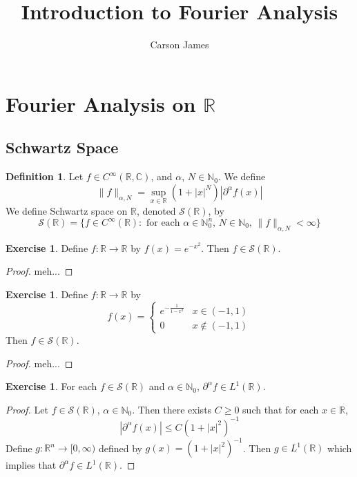 \documentclass[12pt]{amsart}
\theoremstyle{definition}
\newtheorem{defn}[definition]{Definition}
\newtheorem{ex}[definition]{Exercise}
\newcommand{\p}{\partial}
\newcommand{\al}{\alpha}
\newcommand{\C}{\mathbb{C}}
\newcommand{\N}{\mathbb{N}}
\newcommand{\R}{\mathbb{R}}
\newcommand{\MS}{\mathcal{S}}
\newcommand{\Rg}{[0,\infty)}
\newcommand{\lex}[1]{\label{ex:#1}}
\newcommand{\ld}[1]{\label{defn:#1}}
\begin{document}
	
	\title{Introduction to Fourier Analysis}
	\author{Carson James}
	\maketitle
	
	\tableofcontents
	
	\newpage
	\section{Fourier Analysis on $\R$}	
	
	\subsection{Schwartz Space}
	
	\begin{defn}
		\ld{101} Let $f \in C^{\infty}(\R, \C)$, and $\al$, $N \in \N_0$. We define $$\|f\|_{\al, N} = \sup_{x \in \R} (1+|x|^N) |\p^{\al}f (x) |$$
		We define Schwartz space on $\R$, denoted $\MS(\R)$, by $$\MS(\R) = \{f \in C^{\infty}(\R): \text{ for each $\al \in \N_0^n$, $N \in \N_0$, } \|f\|_{\al, N} < \infty\}$$
	\end{defn}

	\begin{ex}
		Define $f:\R \rightarrow \R$ by $f(x) = e^{-x^2}$. Then $f \in \MS(\R)$.
	\end{ex}
	
	\begin{proof}
		meh...
	\end{proof}

	\begin{ex}
		Define $f:\R \rightarrow \R$ by 
		\[
		f(x) = 
		\begin{cases}
			e^{- \frac{1}{1-x^2}} & x \in (-1, 1) \\
			0 & x \not \in (-1, 1)
		\end{cases}
		\]
		Then $f \in \MS(\R)$.
	\end{ex}
	
	\begin{proof}
		meh...
	\end{proof}
	
	\begin{ex}
		\lex{102} For each $f \in \MS(\R)$ and $\al \in \N_0$, $\p^\al f \in L^1(\R)$.
	\end{ex}
	
	\begin{proof}
		Let $f \in \MS(\R)$, $\al \in \N_0$. Then there exists $C \geq 0$ such that for each $x \in \R$, $$| \p^{\al} f(x)| \leq C(1+|x|^{2})^{-1}$$
		Define $g:\R^n \rightarrow \Rg$ defined by $g(x) = (1+|x|^{2})^{-1}$. Then $g \in L^1(\R)$ which implies that $\p^{\al} f \in L^1(\R)$.
	\end{proof}
\end{document}

